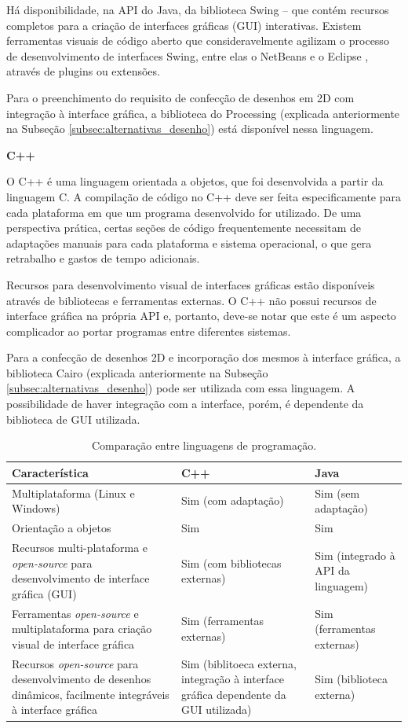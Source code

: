 Há disponibilidade, na API do Java, da biblioteca Swing -- que contém recursos completos para a criação de interfaces gráficas (GUI) interativas. Existem ferramentas visuais de código aberto que consideravelmente agilizam o processo de desenvolvimento de interfaces Swing, entre elas o NetBeans \cite{netbeans} e o Eclipse \cite{eclipse}, através de plugins ou extensões. 

Para o preenchimento do requisito de confecção de desenhos em 2D com integração à interface gráfica, a biblioteca do Processing (explicada anteriormente na Subseção \ref{subsec:alternativas_desenho}) está disponível nessa linguagem.


\textbf{C++}

O C++ é uma linguagem orientada a objetos, que foi desenvolvida a partir da linguagem C. A compilação de código no C++ deve ser feita especificamente para cada plataforma em que um programa desenvolvido for utilizado. De uma perspectiva prática, certas seções de código frequentemente necessitam de adaptações manuais para cada plataforma e sistema operacional, o que gera retrabalho e gastos de tempo adicionais. 

Recursos para desenvolvimento visual de interfaces gráficas estão disponíveis através de bibliotecas e ferramentas externas. O C++ não possui recursos de interface gráfica na própria API e, portanto, deve-se notar que este é um aspecto complicador ao portar programas entre diferentes sistemas. 

Para a confecção de desenhos 2D e incorporação dos mesmos à interface gráfica, a biblioteca Cairo (explicada anteriormente na Subseção \ref{subsec:alternativas_desenho}) pode ser utilizada com essa linguagem. A possibilidade de haver integração com a interface, porém, é dependente da biblioteca de GUI utilizada.


\begin{table}[h]
  \caption{Comparação entre linguagens de programação.}
  \centering
  \begin{tabular}{p{6cm}|p{4cm}p{4cm}}
    \toprule
    \textbf{Característica} & \textbf{C++} & \textbf{Java} \\
    \hline
    Multiplataforma (Linux e Windows) & Sim (com adaptação) & Sim (sem adaptação) \\
    \hline
    Orientação a objetos & Sim & Sim \\
    \hline
    Recursos multi-plataforma e \textit{open-source} para desenvolvimento de interface gráfica (GUI) & Sim (com bibliotecas externas) & Sim (integrado à API da linguagem) \\
    \hline
    Ferramentas \textit{open-source} e multiplataforma para criação visual de interface gráfica & Sim (ferramentas externas) & Sim (ferramentas externas) \\
    \hline
    Recursos \textit{open-source} para desenvolvimento de desenhos dinâmicos, facilmente integráveis à interface gráfica & Sim (biblitoeca externa, integração à interface gráfica dependente da GUI utilizada) & Sim (biblioteca externa) \\
    \bottomrule
  \end{tabular}
  \label{tab:alternativas_linguagens}
\end{table}

